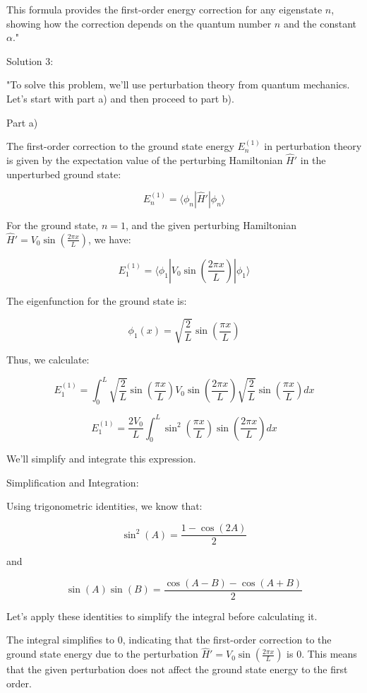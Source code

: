 This formula provides the first-order energy correction for any eigenstate \(n\), showing how the correction depends on the quantum number \(n\) and the constant \(\alpha\)."

Solution 3:

"To solve this problem, we'll use perturbation theory from quantum mechanics. Let's start with part a) and then proceed to part b).

Part a)

The first-order correction to the ground state energy \( E_{n}^{(1)} \) in perturbation theory is given by the expectation value of the perturbing Hamiltonian \( \hat{H}' \) in the unperturbed ground state:

\[ E_{n}^{(1)} = \langle \phi_{n} | \hat{H}' | \phi_{n} \rangle \]

For the ground state, \( n = 1 \), and the given perturbing Hamiltonian \( \hat{H}' = V_{0} \sin\left(\frac{2 \pi x}{L} \right) \), we have:

\[ E_{1}^{(1)} = \langle \phi_{1} | V_{0} \sin\left(\frac{2 \pi x}{L} \right) | \phi_{1} \rangle \]

The eigenfunction for the ground state is:

\[ \phi_{1}(x) = \sqrt{\frac{2}{L}} \sin\left(\frac{\pi x}{L} \right) \]

Thus, we calculate:

\[ E_{1}^{(1)} = \int_{0}^{L} \sqrt{\frac{2}{L}} \sin\left(\frac{\pi x}{L}\right) V_{0} \sin\left(\frac{2 \pi x}{L}\right) \sqrt{\frac{2}{L}} \sin\left(\frac{\pi x}{L}\right) dx \]

\[ E_{1}^{(1)} = \frac{2V_{0}}{L} \int_{0}^{L} \sin^{2}\left(\frac{\pi x}{L}\right) \sin\left(\frac{2 \pi x}{L}\right) dx \]

We'll simplify and integrate this expression.

Simplification and Integration:

Using trigonometric identities, we know that:

\[ \sin^{2}(A) = \frac{1 - \cos(2A)}{2} \]

and

\[ \sin(A)\sin(B) = \frac{\cos(A-B) - \cos(A+B)}{2} \]

Let's apply these identities to simplify the integral before calculating it.

The integral simplifies to \(0\), indicating that the first-order correction to the ground state energy due to the perturbation \( \hat{H}' = V_{0} \sin\left(\frac{2 \pi x}{L} \right) \) is \(0\). This means that the given perturbation does not affect the ground state energy to the first order.

